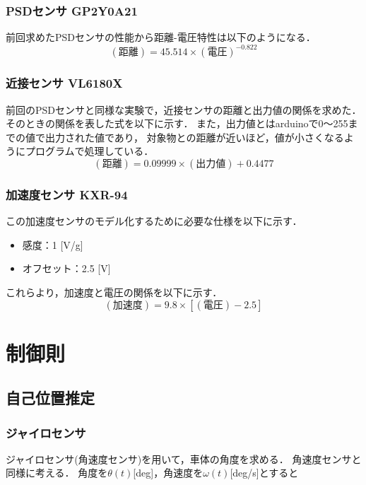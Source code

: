 \documentclass[11pt,a4]{jsarticle}
\begin{document}
\subsubsection{PSDセンサ GP2Y0A21}
前回求めたPSDセンサの性能から距離-電圧特性は以下のようになる．
\begin{equation}
 (距離)=45.514×(電圧)^{-0.822}
\end{equation}

\subsubsection{近接センサ VL6180X}
前回のPSDセンサと同様な実験で，近接センサの距離と出力値の関係を求めた．
そのときの関係を表した式を以下に示す．
また，出力値とはarduinoで0〜255までの値で出力された値であり，
対象物との距離が近いほど，値が小さくなるようにプログラムで処理している．
\begin{equation}
 (距離)=0.09999×(出力値)+0.4477
\end{equation}

\subsubsection{加速度センサ KXR-94 }
この加速度センサのモデル化するために必要な仕様を以下に示す．
\begin{itemize}
 \item 感度：1 [V/g]
 \item オフセット：2.5 [V]
\end{itemize}

これらより，加速度と電圧の関係を以下に示す．
\begin{equation}
 (加速度)=9.8×[(電圧)-2.5]
\end{equation}


\section{制御則}

\subsection{自己位置推定}
\subsubsection{ジャイロセンサ}
ジャイロセンサ(角速度センサ)を用いて，車体の角度を求める．
角速度センサと同様に考える．
角度を$\theta(t)$[deg]，角速度を$\omega(t)$[deg/s]とすると
\end{document}
